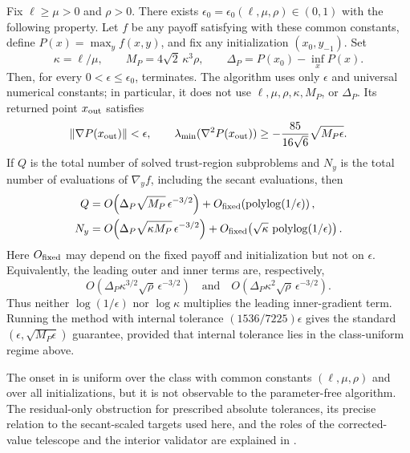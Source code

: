 \documentclass{article}
\begin{document}
\begin{theorem}
\label{thm:adaptive-fixed-radius-scar}
Fix $\ell\ge\mu>0$ and $\rho>0$.  There exists
$\epsilon_0=\epsilon_0(\ell,\mu,\rho)\in(0,1)$ with the following
property.  Let $f$ be any payoff satisfying  with
these common constants, define $P(x)=\max_y f(x,y)$, and fix any
initialization $(x_0,y_{-1})$.  Set
\[
 \kappa=\ell/\mu,
 \qquad M_P=4\sqrt2\,\kappa^3\rho,
 \qquad \Delta_P=P(x_0)-\inf_xP(x).
\]
Then, for every $0<\epsilon\le\epsilon_0$,
 terminates.  The algorithm uses
only $\epsilon$ and universal numerical constants; in particular, it
does not use $\ell,\mu,\rho,\kappa,M_P$, or $\Delta_P$.  Its returned
point $x_{\rm out}$ satisfies
\begin{equation}\label{eq:fixed-radius-return}
 \|\nabla P(x_{\rm out})\|<\epsilon,
 \qquad
 \lambda_{\min}(\nabla^2P(x_{\rm out}))
 \ge-\frac{85}{16\sqrt6}\sqrt{M_P\epsilon}.
\end{equation}
If $Q$ is the total number of solved trust-region subproblems and
$N_y$ is the total number of evaluations of $\nabla_yf$, including
the secant evaluations, then
\begin{subequations}\label{eq:fixed-radius-complexities}
\begin{align}
 Q
 &=O\!\left(\Delta_P\sqrt{M_P}\,\epsilon^{-3/2}\right)
   +O_{\rm fixed}\!\left(\operatorname{polylog}(1/\epsilon)\right),
 \label{eq:fixed-radius-leading-outer}\\
 N_y&=
 O\!\left(
  \Delta_P\sqrt{\kappa M_P}\,\epsilon^{-3/2}
 \right)
 +O_{\rm fixed}\!\left(
  \sqrt\kappa\,\operatorname{polylog}(1/\epsilon)
 \right).
 \label{eq:fixed-radius-inner-leading}
\end{align}
\end{subequations}
Here $O_{\rm fixed}$ may depend on the fixed payoff and initialization
but not on $\epsilon$.  Equivalently, the leading outer and inner
terms are, respectively,
\[
 O(\Delta_P\kappa^{3/2}\sqrt\rho\,\epsilon^{-3/2})
 \quad\text{and}\quad
 O(\Delta_P\kappa^2\sqrt\rho\,\epsilon^{-3/2}).
\]
Thus neither $\log(1/\epsilon)$ nor $\log\kappa$ multiplies the leading
inner-gradient term.  Running the method with internal tolerance
$(1536/7225)\epsilon$ gives the standard
$(\epsilon,\sqrt{M_P\epsilon})$ guarantee, provided that internal
tolerance lies in the class-uniform regime above.
\end{theorem}

\begin{remark}
The onset in  is uniform over the
class with common constants $(\ell,\mu,\rho)$ and over all
initializations, but it is not observable to the parameter-free
algorithm.  The residual-only obstruction for prescribed absolute
tolerances, its precise relation to the secant-scaled targets used here,
and the roles of the corrected-value telescope and the interior
validator are explained in .
\end{remark}
\end{document}
